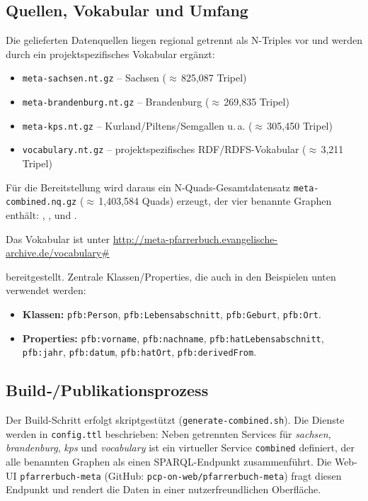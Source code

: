 \subsection{Quellen, Vokabular und Umfang}
Die gelieferten Datenquellen liegen regional getrennt als N-Triples vor und werden durch ein projektspezifisches Vokabular ergänzt:
\begin{itemize}
\item \texttt{meta-sachsen.nt.gz} – Sachsen ($\approx$\,825{,}087 Tripel)
\item \texttt{meta-brandenburg.nt.gz} – Brandenburg ($\approx$\,269{,}835 Tripel)
\item \texttt{meta-kps.nt.gz} – Kurland/Piltens/Semgallen u.\,a. ($\approx$\,305{,}450 Tripel)
\item \texttt{vocabulary.nt.gz} – projektspezifisches RDF/RDFS-Vokabular ($\approx$\,3{,}211 Tripel)
\end{itemize}
Für die Bereitstellung wird daraus ein N-Quads-Gesamtdatensatz \texttt{meta-combined.nq.gz} ($\approx$\,1{,}403{,}584 Quads) erzeugt, der vier benannte Graphen enthält:
, ,  und .

Das Vokabular ist unter
\url{http://meta-pfarrerbuch.evangelische-archive.de/vocabulary\#}

bereitgestellt. Zentrale Klassen/Properties, die auch in den Beispielen unten verwendet werden:
\begin{itemize}
\item \textbf{Klassen:} \texttt{pfb:Person}, \texttt{pfb:Lebensabschnitt}, \texttt{pfb:Geburt}, \texttt{pfb:Ort}.
\item \textbf{Properties:} \texttt{pfb:vorname}, \texttt{pfb:nachname}, \texttt{pfb:hatLebensabschnitt}, \texttt{pfb:jahr}, \texttt{pfb:datum}, \texttt{pfb:hatOrt}, \texttt{pfb:derivedFrom}.
\end{itemize}

\subsection{Build‐/Publikationsprozess}
Der Build-Schritt erfolgt skriptgestützt (\texttt{generate-combined.sh}). Die Dienste werden in \texttt{config.ttl} beschrieben: Neben getrennten Services für \emph{sachsen}, \emph{brandenburg}, \emph{kps} und \emph{vocabulary} ist ein virtueller Service \texttt{combined} definiert, der alle benannten Graphen als einen SPARQL-Endpunkt zusammenführt. Die Web-UI \texttt{pfarrerbuch-meta} (GitHub: \texttt{pcp-on-web/pfarrerbuch-meta}) fragt diesen Endpunkt und rendert die Daten in einer nutzerfreundlichen Oberfläche.

